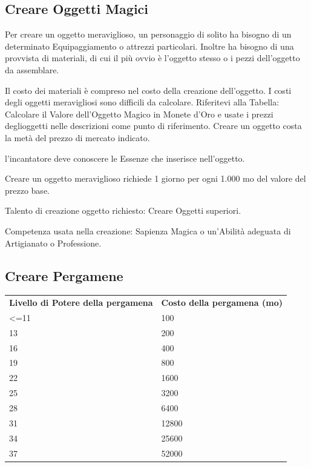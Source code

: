 \documentclass[a4paper,11pt,twoside,openany]{book}
\begin{document}
\subsection{Creare Oggetti Magici}

Per creare un oggetto meraviglioso, un personaggio di solito ha bisogno di un determinato Equipaggiamento o attrezzi particolari. Inoltre ha bisogno di una provvista di materiali, di cui il più ovvio è l'oggetto stesso o i pezzi dell'oggetto da assemblare.

Il costo dei materiali è compreso nel costo della creazione dell'oggetto. I costi degli oggetti meravigliosi sono difficili da calcolare. Riferitevi alla Tabella: Calcolare il Valore dell'Oggetto Magico in Monete d'Oro e usate i prezzi deglioggetti nelle descrizioni come punto di riferimento. Creare un oggetto costa la metà del prezzo di mercato indicato.

l'incantatore deve conoscere le Essenze che inserisce nell'oggetto.

Creare un oggetto meraviglioso richiede 1 giorno per ogni 1.000 mo del valore del prezzo base.

Talento di creazione oggetto richiesto: Creare Oggetti superiori.

Competenza usata nella creazione: Sapienza Magica o un'Abilità adeguata
di Artigianato o Professione.

\subsection{Creare Pergamene}

\begin{tabular}{ll}
	\toprule
	\textbf{Livello di Potere della pergamena} & \textbf{Costo della pergamena (mo)}\\
	\textless=11               & 100\\
	13         & 200\\
	16         & 400\\
	19         & 800\\
	22         & 1600\\
	25         & 3200\\
	28         & 6400\\
	31         & 12800\\
	34         & 25600\\
	37         & 52000\\
\end{tabular}
\end{document}
